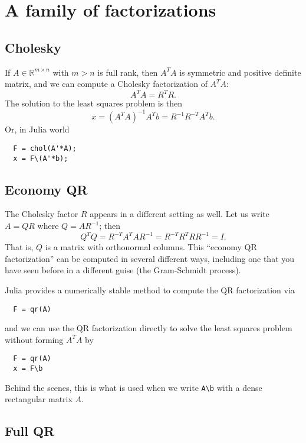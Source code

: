 \documentclass[12pt, leqno]{article} %
\begin{document}

\section{A family of factorizations}

\subsection{Cholesky}

If $A \in \mathbb{R}^{m \times n}$ with $m > n$ is full rank, then
$A^T A$ is symmetric and positive definite matrix, and we can compute
a Cholesky factorization of $A^T A$:
\[
  A^T A = R^T R.
\]
The solution to the least squares problem is then
\[
  x = (A^T A)^{-1} A^T b = R^{-1} R^{-T} A^T b.
\]
Or, in Julia world
\begin{lstlisting}
  F = chol(A'*A);
  x = F\(A'*b);
\end{lstlisting}

\subsection{Economy QR}

The Cholesky factor $R$ appears in a different setting as well.
Let us write $A = QR$ where $Q = AR^{-1}$; then
\[
  Q^T Q = R^{-T} A^T A R^{-1} = R^{-T} R^T R R^{-1} = I.
\]
That is, $Q$ is a matrix with orthonormal columns.  This
``economy QR factorization'' can be computed in several different
ways, including one that you have seen before in a different guise
(the Gram-Schmidt process).

Julia provides a numerically stable
method to compute the QR factorization via
\begin{lstlisting}
  F = qr(A)
\end{lstlisting}
and we can use the QR factorization directly to solve the least
squares problem without forming $A^T A$ by
\begin{lstlisting}
  F = qr(A)
  x = F\b
\end{lstlisting}
Behind the scenes, this is what is used when we write \verb|A\b| with
a dense rectangular matrix $A$.

\subsection{Full QR}
\end{document}
